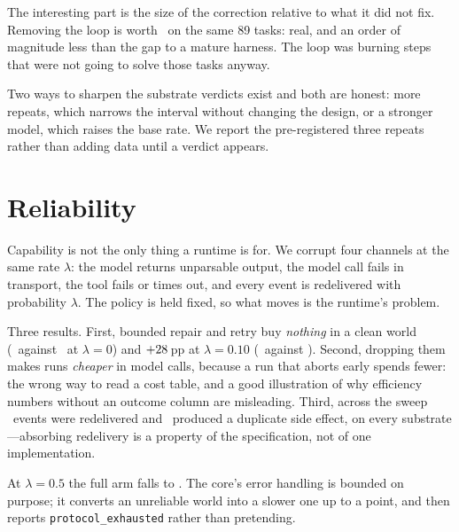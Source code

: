 \documentclass[11pt,a4paper]{article}
\begin{document}
The interesting part is the size of the correction relative to what it did not
fix. Removing the loop is worth \tbpromptdiff\ on the same 89 tasks: real, and
an order of magnitude less than the gap to a mature harness. The loop was
burning steps that were not going to solve those tasks anyway.

Two ways to sharpen the substrate verdicts exist and both are honest: more
repeats, which narrows the interval without changing the design, or a stronger
model, which raises the base rate. We report the pre-registered three repeats
rather than adding data until a verdict appears.

\section{Reliability}
\label{sec:faults}

Capability is not the only thing a runtime is for. We corrupt four channels at
the same rate $\lambda$: the model returns unparsable output, the model call
fails in transport, the tool fails or times out, and every event is redelivered
with probability $\lambda$. The policy is held fixed, so what moves is the
runtime's problem.

\begin{table}[h]\centering\small
\caption{Fault surface. \texttt{no\_repair}, \texttt{no\_retry} and
\texttt{no\_recovery} remove the corresponding budgets from the kernel.}
\label{tab:faults}

\end{table}

Three results. First, bounded repair and retry buy \emph{nothing} in a clean
world (\fullclean\ against \norecclean\ at $\lambda=0$) and
$+28$\,pp at $\lambda=0.10$ (\fullten\ against \norecten). Second, dropping them makes runs
\emph{cheaper} in model calls, because a run that aborts early spends fewer:
the wrong way to read a cost table, and a good illustration of why efficiency
numbers without an outcome column are misleading. Third, across the sweep
\faultredelivered\ events were redelivered and \faultdup\ produced a duplicate
side effect, on every substrate---absorbing redelivery is a property of the
specification, not of one implementation.

At $\lambda=0.5$ the full arm falls to \fullfifty. The core's error handling is
bounded on purpose; it converts an unreliable world into a slower one up to a
point, and then reports \texttt{protocol\_exhausted} rather than pretending.
\end{document}
